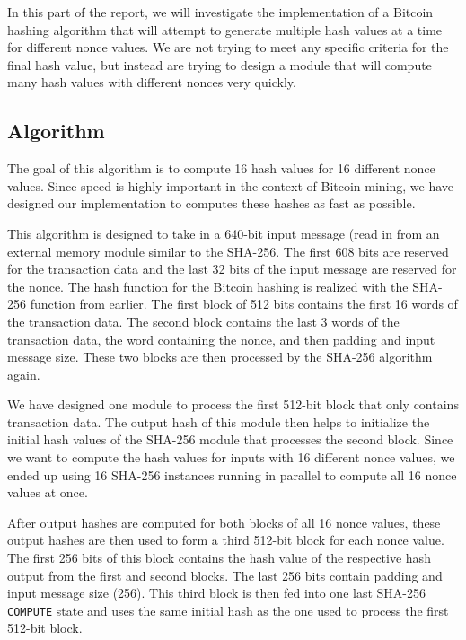 \documentclass{article}
\begin{document}
In this part of the report, we will investigate the implementation of a Bitcoin hashing algorithm that will attempt to generate multiple hash values at a time for different nonce values. We are not trying to meet any specific criteria for the final hash value, but instead are trying to design a module that will compute many hash values with different nonces very quickly.

\subsection{Algorithm}

The goal of this algorithm is to compute 16 hash values for 16 different nonce values. Since speed is highly important in the context of Bitcoin mining, we have designed our implementation to computes these hashes as fast as possible.

This algorithm is designed to take in a 640-bit input message (read in from an external memory module similar to the SHA-256. The first 608 bits are reserved for the transaction data and the last 32 bits of the input message are reserved for the nonce. The hash function for the Bitcoin hashing is realized with the SHA-256 function from earlier. The first block of 512 bits contains the first 16 words of the transaction data. The second block contains the last 3 words of the transaction data, the word containing the nonce, and then padding and input message size. These two blocks are then processed by the SHA-256 algorithm again.

We have designed one module to process the first 512-bit block that only contains transaction data. The output hash of this module then helps to initialize the initial hash values of the SHA-256 module that processes the second block. Since we want to compute the hash values for inputs with 16 different nonce values, we ended up using 16 SHA-256 instances running in parallel to compute all 16 nonce values at once.

After output hashes are computed for both blocks of all 16 nonce values, these output hashes are then used to form a third 512-bit block for each nonce value. The first 256 bits of this block contains the hash value of the respective hash output from the first and second blocks. The last 256 bits contain padding and input message size (256). This third block is then fed into one last SHA-256 \verb|COMPUTE| state and uses the same initial hash as the one used to process the first 512-bit block.
\end{document}
